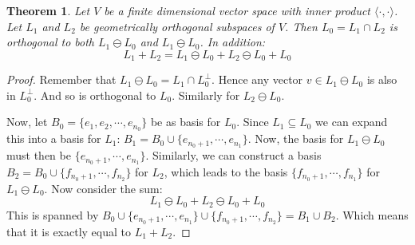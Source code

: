 \documentclass[12pt, a4paper]{article}
\newtheorem{theorem}{Theorem}[section]
\numberwithin{equation}{section}
\begin{document}
\begin{theorem}
\label{sum_split_three_way}
Let $V$ be a finite dimensional vector space with inner product $\langle\cdot,\cdot\rangle$. Let $L_1$ and $L_2$ be geometrically orthogonal subspaces of $V$. Then $L_0=L_1\cap L_2$ is orthogonal to both $L_1\ominus L_0$ and $L_1\ominus L_0$. In addition:
\begin{equation}
L_1+L_2=L_1\ominus L_0+L_2\ominus L_0+L_0
\end{equation}
\end{theorem}
\begin{proof}
Remember that $L_1\ominus L_0=L_1\cap L_0^\perp$. Hence any vector $v\in L_1\ominus L_0$ is also in $L_0^\perp$. And so is orthogonal to $L_0$. Similarly for $L_2\ominus L_0$.

Now, let $B_0=\{e_1,e_2,\cdots,e_{n_0}\}$ be as basis for $L_0$. Since $L_1\subseteq L_0$ we can expand this into a basis for $L_1$: $B_1=B_0\cup\{e_{n_0+1},\cdots,e_{n_1}\}$. Now, the basis for $L_1\ominus L_0$ must then be $\{e_{n_0+1},\cdots,e_{n_1}\}$. Similarly, we can construct a basis $B_2=B_0\cup\{f_{n_0+1},\cdots,f_{n_2}\}$ for $L_2$, which leads to the basis $\{f_{n_0+1},\cdots,f_{n_1}\}$ for $L_1\ominus L_0$. Now consider the sum:
\begin{equation}
L_1\ominus L_0+L_2\ominus L_0+L_0
\end{equation}
This is spanned by $B_0\cup\{e_{n_0+1},\cdots,e_{n_1}\}\cup\{f_{n_0+1},\cdots,f_{n_2}\}=B_1\cup B_2$. Which means that it is exactly equal to $L_1+L_2$.
\end{proof}
\end{document}

